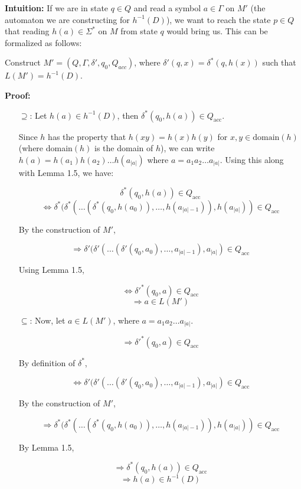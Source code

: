 \textbf{Intuition:} If we are in state \( q \in Q \) and read a symbol \( a \in \Gamma \) on \( M' \) (the automaton we are constructing for \( h^{-1}(D) \)), we want to reach the state \( p \in Q \) that reading \( h(a) \in \Sigma^* \) on \( M \) from state \( q \) would bring us. This can be formalized as follows:

Construct \( M' = (Q, \Gamma, \delta', q_0, Q_{acc}) \), where \( \delta'(q, x) = \delta^*(q, h(x)) \) such that \( L(M') = h^{-1}(D) \).

\textbf{Proof:}
\begin{itemize}
    \item[$\supseteq$:] Let \( h(a) \in h^{-1}(D) \), then \( \delta^*(q_0, h(a)) \in Q_{\text{acc}} \).
    
    Since \( h \) has the property that \( h(xy) = h(x) h(y) \) for \( x, y \in \text{domain}(h) \) (where domain\( (h) \) is the domain of \( h \)), we can write \( h(a) = h(a_1) h(a_2) \dots h(a_{|a|}) \) where \( a = a_1 a_2 \dots a_{|a|} \). Using this along with Lemma 1.5, we have:
    
    \[
    \delta^*(q_0, h(a)) \in Q_{\text{acc}}
    \]
    \[
    \Leftrightarrow \delta^*(\delta^*(\dots(\delta^*(q_0, h(a_0)), \dots, h(a_{|a|-1})), h(a_{|a|})) \in Q_{\text{acc}}
    \]
    
    By the construction of \( M' \),
    
    \[
    \Rightarrow \delta'(\delta'(\dots(\delta'(q_0, a_0), \dots, a_{|a|-1}), a_{|a|}) \in Q_{\text{acc}}
    \]
    
    Using Lemma 1.5,
    
    \[
    \Leftrightarrow \delta'^*(q_0, a) \in Q_{\text{acc}}
    \]
    \[
    \Rightarrow a \in L(M')
    \]

    \item[$\subseteq$:] Now, let \( a \in L(M') \), where \( a = a_1 a_2 \dots a_{|a|} \).
    
    \[
    \Rightarrow \delta'^*(q_0, a) \in Q_{\text{acc}}
    \]

    By definition of \( \delta^* \),

    \[
    \Leftrightarrow \delta'(\delta'(\dots(\delta'(q_0, a_0), \dots, a_{|a|-1}), a_{|a|}) \in Q_{\text{acc}}
    \]

    By the construction of \( M' \),

    \[
    \Rightarrow \delta^*(\delta^*(\dots(\delta^*(q_0, h(a_0)), \dots, h(a_{|a|-1})), h(a_{|a|})) \in Q_{\text{acc}}
    \]

    By Lemma 1.5,

    \[
    \Rightarrow \delta^*(q_0, h(a)) \in Q_{\text{acc}}
    \]
    \[
    \Rightarrow h(a) \in h^{-1}(D)
    \]

    \qedsymbol
\end{itemize}




